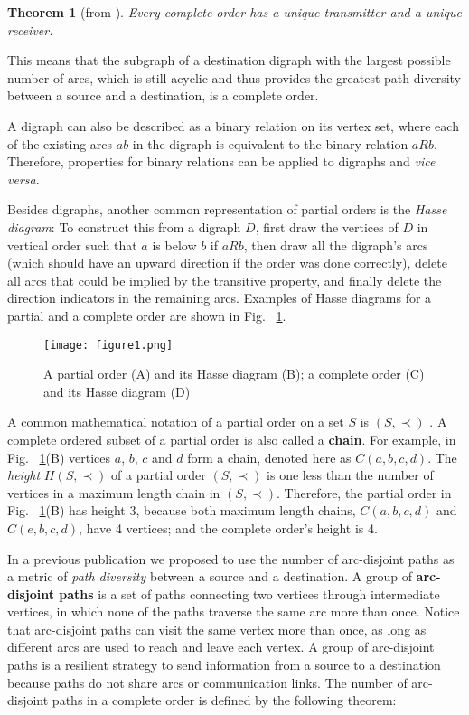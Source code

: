 \documentclass[5p,twocolumn]{elsarticle}
\newtheorem{theorem}{Theorem}
\begin{document}
\begin{theorem}[from \cite{Harary1965}]
Every complete order has a unique transmitter and a unique receiver.
\end{theorem}

This means that the subgraph of a destination digraph with the largest possible number of arcs, which is still acyclic and thus provides the greatest path diversity between a source and a destination, is a complete order.

A digraph can also be described as a binary relation on its vertex set, where each of the existing arcs $ab$ in the digraph is equivalent to the binary relation $ aRb$. Therefore, properties for binary relations can be applied to digraphs and \emph{vice versa}.

Besides digraphs, another common representation of partial orders is the \emph{Hasse diagram}: To construct this from a digraph $D$, first draw the vertices of $D$ in vertical order such that $a$ is below $b$ if $aRb$, then draw all the digraph's arcs (which should have an upward direction if the order was done correctly), delete all arcs that could be implied by the transitive property, and finally delete the direction indicators in the remaining arcs. Examples of Hasse diagrams for a partial and a complete order are shown in Fig.~ \ref{fig:Hassediagram}.

\begin{figure}[!t]
	\centering
	\texttt{[image: figure1.png]}
	\caption{A partial order (A) and its Hasse diagram (B); a complete order (C) and its Hasse diagram (D)}
	\label{fig:Hassediagram}
\end{figure}

A common mathematical notation of a partial order on a set $S$ is $(S,\prec)$ \cite{Fishburn1985}. A complete ordered subset of a partial order is also called a \textbf{chain}. For example, in Fig.~ \ref{fig:Hassediagram}(B) vertices $a$, $b$, $c$ and $d$ form a chain, denoted here as $C(a, b, c, d)$. The \emph{height} $H(S,\prec)$ of a partial order $(S,\prec)$ is one less than the number of vertices in a maximum length chain in $(S,\prec)$. Therefore, the partial order in Fig.~ \ref{fig:Hassediagram}(B) has height 3, because both maximum length chains, $C(a, b, c, d)$ and $C(e, b, c, d)$, have 4 vertices; and the complete order's height is 4.

In a previous publication \cite{Arjona-Villicana2010} we proposed to use the number of arc-disjoint paths as a metric of \emph{path diversity} between a source and a destination.  A group of \textbf{arc-disjoint paths} is a set of paths connecting two vertices through intermediate vertices, in which none of the paths traverse the same arc more than once. Notice that arc-disjoint paths can visit the same vertex more than once, as long as different arcs are used to reach and leave each vertex. A group of arc-disjoint paths is a resilient strategy to send information from a source to a destination because paths do not share arcs or communication links. The number of arc-disjoint paths in a complete order is defined by the following theorem:
\end{document}
